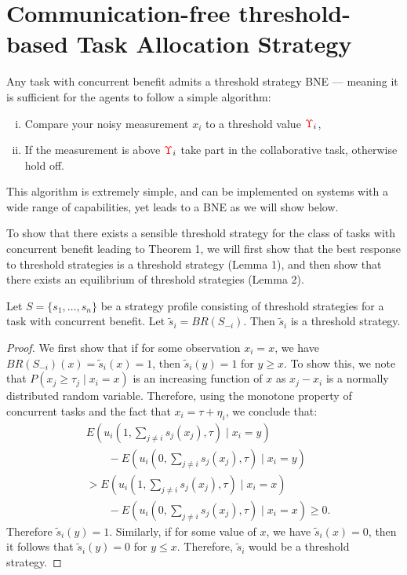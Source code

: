 \documentclass[smallextended]{svjour3}       %
\newcommand{\edit}[1]{\textcolor{red}{#1}}
\def\td{\edit{\Upsilon}}   %
\begin{document}
\section{Communication-free threshold-based Task Allocation Strategy}\label{sec:discretethreshold}
Any task with concurrent benefit admits a threshold strategy BNE --- meaning it is sufficient for the agents to follow a simple algorithm: 
\begin{enumerate}[(i)]
\item Compare your noisy measurement $x_i$ to a threshold value $\td_i$,
\item If the measurement is above $\td_i$ take part in the collaborative task, otherwise hold off.
\end{enumerate}
This algorithm is extremely simple, and can be implemented on systems with a wide range of capabilities, yet leads to a BNE as we will show below.

To show that there exists a sensible threshold strategy for the class of tasks with concurrent benefit leading to Theorem 1, we will first show that the best response to threshold strategies is a threshold strategy (Lemma 1), and then show that there exists an equilibrium of threshold strategies \citep{Carlsson1993,Morris2000} (Lemma 2).

\setcounter{lemma}{0}

\begin{lemma}
Let $S=\{s_1,\ldots,s_n\}$ be a strategy profile consisting of threshold strategies for a task with  concurrent benefit. Let $\tilde{s}_i=BR(S_{-i})$. Then $\tilde{s}_i$ is a threshold strategy. 
\end{lemma} 

\begin{proof}
We first show that if for some observation $x_i=x$, we have $BR(S_{-i})(x)=\tilde{s}_i(x)=1$, then $\tilde{s}_i(y)=1$ for $y\geq x$. To show this,  we note that $P(x_j\geq \tau_j\mid x_i=x)$ is an increasing function of $x$ as $x_j-x_i$ is a normally distributed random variable. Therefore, using the monotone property of concurrent tasks and the fact that $x_i=\tau+\eta_i$, we conclude that:
\vspace{-5px}
\begin{align*}
&E(u_i(1,\sum_{j\not=i}s_j(x_j),\tau)\mid x_i=y)\\ 
&\qquad-E(u_i(0,\sum_{j\not=i}s_j(x_j),\tau)\mid x_i=y)\\ 
&>E(u_i(1,\sum_{j\not=i}s_j(x_j),\tau)\mid x_i=x)\\
&\qquad-E(u_i(0,\sum_{j\not=i}s_j(x_j),\tau)\mid x_i=x)\geq 0.
\end{align*}
Therefore $\tilde{s}_i(y)=1$. Similarly, if for some value of $x$, we have $\tilde{s}_i(x)=0$, then it follows that $\tilde{s}_i(y)=0$ for $y\leq x$. Therefore, $\tilde{s}_i$ would be a threshold strategy.  
\end{proof}
\end{document}
